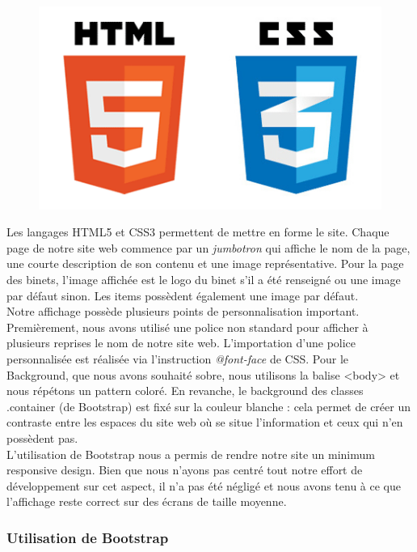 \documentclass[titlepage,11pt,a4paper]{article}
\begin{document}
\begin{figure}
\includegraphics[scale=0.3]{html5-css3.png}
\end{figure}
Les langages HTML5 et CSS3 permettent de mettre en forme le site. Chaque page de notre site web commence par un \emph{jumbotron} qui affiche le nom de la page, une courte description de son contenu et une image représentative. Pour la page des binets, l'image affichée est le logo du binet s'il a été renseigné ou une image par défaut sinon. Les items possèdent également une image par défaut.\\

Notre affichage possède plusieurs points de personnalisation important. Premièrement, nous avons utilisé une police non standard pour afficher à plusieurs reprises le nom de notre site web. L'importation d'une police personnalisée est réalisée via l'instruction \emph{@font-face} de CSS. Pour le Background, que nous avons souhaité sobre, nous utilisons la balise <body> et nous répétons un pattern coloré. En revanche, le background des classes .container (de Bootstrap) est fixé sur la couleur blanche : cela permet de créer un contraste entre les espaces du site web où se situe l'information et ceux qui n'en possèdent pas.\\

L'utilisation de Bootstrap nous a permis de rendre notre site un minimum responsive design. Bien que nous n'ayons pas centré tout notre effort de développement sur cet aspect, il n'a pas été négligé et nous avons tenu à ce que l'affichage reste correct sur des écrans de taille moyenne.

\subsubsection{Utilisation de Bootstrap}
\end{document}
